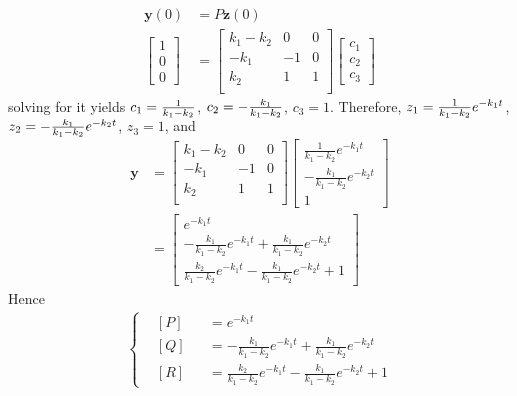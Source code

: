 \begin{solution}
\begin{align*}
\textbf{y}(0) &= P\textbf{z}(0) \\
\begin{bmatrix}
1 \\
0 \\
0
\end{bmatrix} &= 
\begin{bmatrix}
k_1-k_2 & 0 & 0\\
-k_1 & -1 & 0\\
k_2 & 1 & 1\\
\end{bmatrix}
\begin{bmatrix}
c_1 \\
c_2 \\
c_3
\end{bmatrix}
\end{align*}
solving for it yields $c_1 = \smash{\frac{1}{k_1-k_2}}$, $c_2 = \smash{-\frac{k_1}{k_1-k_2}}$, $c_3 = 1$. Therefore, $z_1 = \smash{\frac{1}{k_1-k_2}}e^{-k_1t}$, $z_2 = \smash{-\frac{k_1}{k_1-k_2}}e^{-k_2t}$, $z_3 = 1$, and
\begin{align*}
\textbf{y} &=
\begin{bmatrix}
k_1-k_2 & 0 & 0\\
-k_1 & -1 & 0\\
k_2 & 1 & 1\\
\end{bmatrix}
\begin{bmatrix}
\frac{1}{k_1-k_2}e^{-k_1t} \\
-\frac{k_1}{k_1-k_2}e^{-k_2t} \\
1
\end{bmatrix} \\
&=
\begin{bmatrix}
e^{-k_1t} \\
-\frac{k_1}{k_1-k_2}e^{-k_1t} + \frac{k_1}{k_1-k_2}e^{-k_2t} \\
\frac{k_2}{k_1-k_2}e^{-k_1t} -\frac{k_1}{k_1-k_2}e^{-k_2t} + 1 
\end{bmatrix}
\end{align*}
Hence
\begin{align*}
\left\{\begin{alignedat}{2}
&[P]& &= e^{-k_1t} \\
&[Q]& &= -\frac{k_1}{k_1-k_2}e^{-k_1t} + \frac{k_1}{k_1-k_2}e^{-k_2t} \\
&[R]& &= \frac{k_2}{k_1-k_2}e^{-k_1t} - \frac{k_1}{k_1-k_2}e^{-k_2t} + 1   
\end{alignedat}\right.
\end{align*}

\end{solution}
